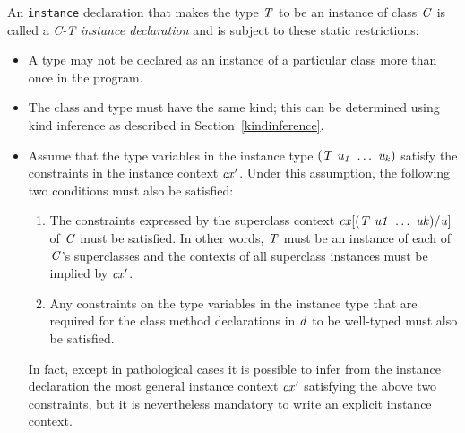 An \mbox{\tt instance} declaration that makes the type \mbox{$\it T$} to be an instance
of class \mbox{$\it C$} is called a {\em C-T instance declaration}
 and is
subject to these static restrictions:
\begin{itemize}

\item A type may not be declared as an instance of a
particular class more than once in the program.

\item The class and type must have the same kind; 
this can be determined using kind inference as described
in Section~\ref{kindinference}.

\item 
Assume that the type variables in the instance type \mbox{$\it (T\ u_1\ \ldots \ u_k)$}
satisfy the constraints in the instance context \mbox{$\it cx'$}.  Under this
assumption, the following two conditions must also be satisfied:
\begin{enumerate}
\item
The constraints expressed by the superclass context \mbox{$\it cx[(T\ u1\ \ldots \ uk)/u]$}
        of \mbox{$\it C$} must be satisfied.  In other words, \mbox{$\it T$} must be an instance
        of each of \mbox{$\it C$}'s superclasses and the contexts of all
        superclass instances must be implied by \mbox{$\it cx'$}.
\item
Any constraints on the type variables in the instance type
      that are required for the class method declarations in \mbox{$\it d$} to be
      well-typed must also be satisfied.
\end{enumerate}

% 

In fact, except in pathological cases 
it is possible to infer from the instance declaration the
most general instance context \mbox{$\it cx'$} satisfying the above two constraints, 
but it is nevertheless mandatory
to write an explicit instance context.
\end{itemize}
